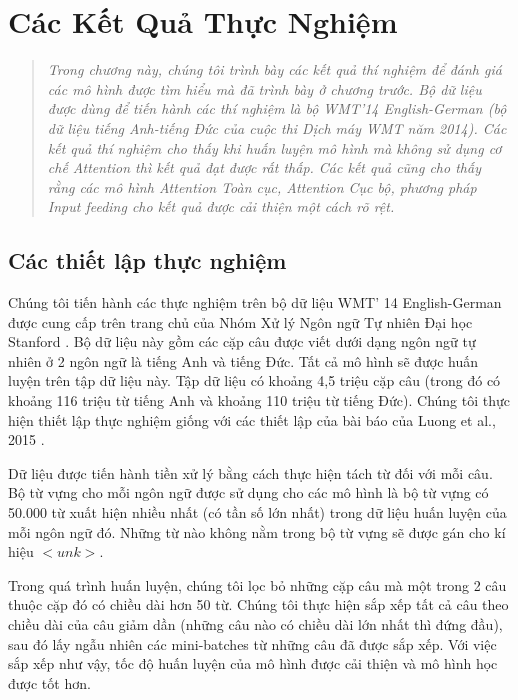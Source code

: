 \chapter{Các Kết Quả Thực Nghiệm}
\ifpdf
    \graphicspath{{Chapter4/Chapter4Figs/PNG/}{Chapter4/Chapter4Figs/PDF/}{Chapter4/Chapter4Figs/}}
\else
    \graphicspath{{Chapter4/Chapter4Figs/EPS/}{Chapter4/Chapter4Figs/}}
\fi
\label{chap_4}
\begin{quote}
\textit{Trong chương này, chúng tôi trình bày các kết quả thí nghiệm để đánh giá các mô hình được tìm hiểu mà đã trình bày ở chương trước. Bộ dữ liệu được dùng để tiến hành các thí nghiệm là bộ WMT'14 English-German (bộ dữ liệu tiếng Anh-tiếng Đức của cuộc thi Dịch máy WMT năm 2014). Các kết quả thí nghiệm cho thấy khi huấn luyện mô hình mà không sử dụng cơ chế Attention thì kết quả đạt được rất thấp. Các kết quả cũng cho thấy rằng các mô hình Attention Toàn cục, Attention Cục bộ, phương pháp Input feeding cho kết quả được cải thiện một cách rõ rệt.}
\end{quote}
\section{Các thiết lập thực nghiệm}
Chúng tôi tiến hành các thực nghiệm trên bộ dữ liệu WMT' 14 English-German được cung cấp trên trang chủ của Nhóm Xử lý Ngôn ngữ Tự nhiên Đại học Stanford \cite{StanfordNMT}. Bộ dữ liệu này gồm các cặp câu được viết dưới dạng ngôn ngữ tự nhiên ở 2 ngôn ngữ là tiếng Anh và tiếng Đức. Tất cả mô hình sẽ được huấn luyện trên tập dữ liệu này. Tập dữ liệu có khoảng 4,5 triệu cặp câu (trong đó có khoảng 116 triệu từ tiếng Anh và khoảng 110 triệu từ tiếng Đức). Chúng tôi thực hiện thiết lập thực nghiệm giống với các thiết lập của bài báo của Luong et al., 2015 \cite{attentionThangLuong2015}.

Dữ liệu được tiến hành tiền xử lý bằng cách thực hiện tách từ đối với mỗi câu. Bộ từ vựng cho mỗi ngôn ngữ được sử dụng cho các mô hình là bộ từ vựng có 50.000 từ xuất hiện nhiều nhất (có tần số lớn nhất) trong dữ liệu huấn luyện của mỗi ngôn ngữ đó. Những từ nào không nằm trong bộ từ vựng sẽ được gán cho kí hiệu $<unk>$.

Trong quá trình huấn luyện, chúng tôi lọc bỏ những cặp câu mà một trong 2 câu thuộc cặp đó có chiều dài hơn 50 từ. Chúng tôi thực hiện sắp xếp tất cả câu theo chiều dài của câu giảm dần (những câu nào có chiều dài lớn nhất thì đứng đầu), sau đó lấy ngẫu nhiên các mini-batches từ những câu đã được sắp xếp. Với việc sắp xếp như vậy, tốc độ huấn luyện của mô hình được cải thiện và mô hình học được tốt hơn.

